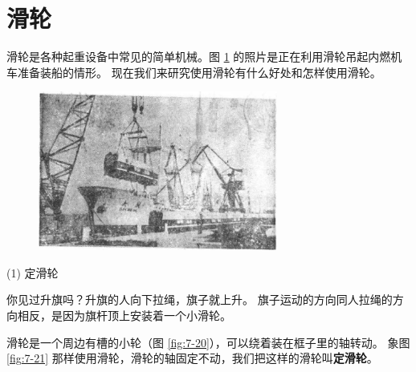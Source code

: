 \section{滑轮}\label{sec:7-5}

滑轮是各种起重设备中常见的简单机械。图 \ref{fig:7-19} 的照片是正在利用滑轮吊起内燃机车准备装船的情形。
现在我们来研究使用滑轮有什么好处和怎样使用滑轮。

\begin{figure}[htbp]
    \centering
    \includegraphics[width=0.7\textwidth]{../pic/czwl1-ch7-19}
    \caption{}\label{fig:7-19}
\end{figure}


(1) 定滑轮

你见过升旗吗？升旗的人向下拉绳，旗子就上升。
旗子运动的方向同人拉绳的方向相反，是因为旗杆顶上安装着一个小滑轮。

滑轮是一个周边有槽的小轮（图 \ref{fig:7-20}），可以绕着装在框子里的轴转动。
象图 \ref{fig:7-21} 那样使用滑轮，滑轮的轴固定不动，我们把这样的滑轮叫\textbf{定滑轮}。

